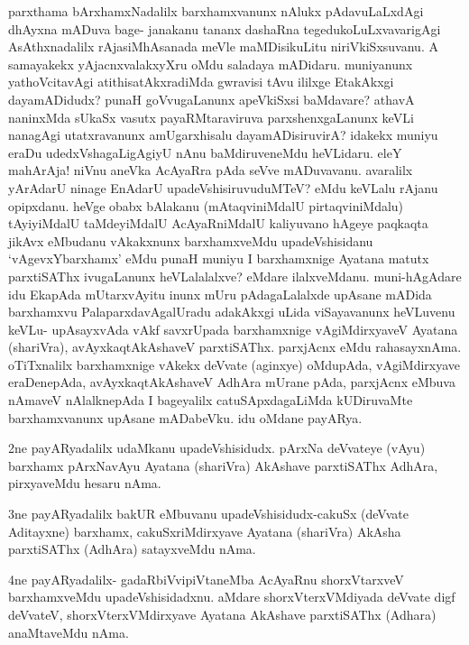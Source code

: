 \begin{artha}
parxthama bArxhamxNadalilx barxhamxvanunx nAlukx pAdavuLaLxdAgi dhAyxna mADuva bage- janakanu tananx dashaRna tegedukoLuLxvavarigAgi AsAthxnadalilx rAjasiMhAsanada meVle maMDisikuLitu niriVkiSxsuvanu. A samayakekx yAjacnxvalakxyXru oMdu saladaya mADidaru. muniyanunx yathoVcitavAgi atithisatAkxradiMda gwravisi tAvu ililxge EtakAkxgi dayamADidudx? punaH goVvugaLanunx apeVkiSxsi baMdavare? athavA naninxMda sUkaSx vasutx payaRMtaraviruva parxshenxgaLanunx keVLi nanagAgi utatxravanunx amUgarxhisalu dayamADisiruvirA? idakekx muniyu eraDu udedxVshagaLigAgiyU nAnu baMdiruveneMdu heVLidaru. eleY mahArAja! niVnu aneVka AcAyaRra pAda seVve mADuvavanu. avaralilx yArAdarU ninage EnAdarU upadeVshisiruvuduMTeV? eMdu keVLalu rAjanu opipxdanu. heVge obabx bAlakanu (mAtaqviniMdalU pirtaqviniMdalu) tAyiyiMdalU taMdeyiMdalU AcAyaRniMdalU kaliyuvano hAgeye paqkaqta jikAvx eMbudanu vAkakxnunx barxhamxveMdu upadeVshisidanu `vAgevxYbarxhamx' eMdu punaH muniyu I barxhamxnige Ayatana matutx parxtiSAThx ivugaLanunx heVLalalalxve? eMdare ilalxveMdanu. muni-hAgAdare idu EkapAda mUtarxvAyitu inunx mUru pAdagaLalalxde upAsane mADida barxhamxvu PalaparxdavAgalUradu adakAkxgi uLida viSayavanunx heVLuvenu keVLu- upAsayxvAda vAkf savxrUpada barxhamxnige vAgiMdirxyaveV Ayatana (shariVra), avAyxkaqtAkAshaveV parxtiSAThx. parxjAcnx eMdu rahasayxnAma. oTiTxnalilx barxhamxnige vAkekx deVvate (aginxye) oMdupAda, vAgiMdirxyave eraDenepAda, avAyxkaqtAkAshaveV AdhAra mUrane pAda, parxjAcnx eMbuva nAmaveV nAlalknepAda I bageyalilx catuSApxdagaLiMda kUDiruvaMte barxhamxvanunx upAsane mADabeVku. idu oMdane payARya. 
\end{artha}

\begin{artha}
2ne payARyadalilx udaMkanu upadeVshisidudx. pArxNa deVvateye (vAyu) barxhamx pArxNavAyu Ayatana (shariVra) AkAshave parxtiSAThx AdhAra, pirxyaveMdu hesaru nAma.
\end{artha}

\begin{artha}
3ne payARyadalilx bakUR eMbuvanu upadeVshisidudx-cakuSx (deVvate Aditayxne) barxhamx, cakuSxriMdirxyave Ayatana (shariVra) AkAsha parxtiSAThx (AdhAra) satayxveMdu nAma.
\end{artha}

\begin{artha}%
4ne payARyadalilx- gadaRbiVvipiVtaneMba AcAyaRnu shorxVtarxveV barxhamxveMdu upadeVshisidadxnu. aMdare shorxVterxVMdiyada deVvate digf deVvateV, shorxVterxVMdirxyave Ayatana AkAshave parxtiSAThx (Adhara) anaMtaveMdu nAma. 
\end{artha}

